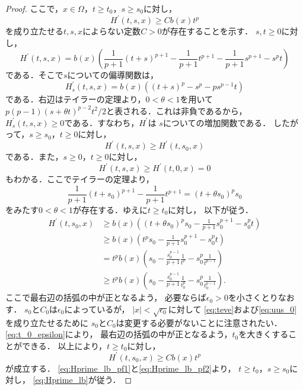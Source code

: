 \begin{proof}
ここで，$x \in \Omega$，$t \geq t_0$，$s \geq s_0$に対し，
\begin{equation}
 H^\prime (t, s, x) \geq C b(x) t^p \label{eq:Hprime_lb}
\end{equation}
を成り立たせる$t, s, x$によらない定数$C>0$が存在することを示す．
$s, t \geq 0$に対し，
\[
 H^\prime(t, s, x) = b(x) \left( \frac{1}{p+1}(t+s)^{p+1} -
 \frac{1}{p+1} t^{p+1} - \frac{1}{p+1} s^{p+1} - s^p t \right)
\]
である．そこで$s$についての偏導関数は，
\[
 H^\prime_s (t, s, x) = b(x) \left( (t+s)^p - s^p - ps^{p-1}t \right)
\]
である．右辺はテイラーの定理より，$0 < \theta < 1$を用いて
$p(p-1)(s + \theta t)^{p-2}t^2/2$と表される．これは非負であるから，
$H^\prime_s(t, s, x) \geq 0$である．すなわち，$H^\prime$は
$s$についての増加関数である．
したがって，$s \geq s_0$，$t \geq 0$に対し，
\begin{equation}
 H^\prime(t, s, x) \geq H^\prime(t, s_0, x) \label{eq:Hprime_lb_pf1}
\end{equation}
である．また，$s \geq 0$，$t \geq 0$に対し，
\begin{equation}
 H^\prime(t, s, x) \geq H^\prime(t, 0, x) = 0 \label{eq:Hprime_lb_pf3}
\end{equation}
もわかる．ここでテイラーの定理より，
\[
 \frac{1}{p+1} (t + s_0)^{p+1} - \frac{1}{p+1} t^{p+1} = (t + \theta
 s_0)^p s_0
\]
 をみたす$0 < \theta < 1$が存在する．ゆえに$t \geq t_0$に対し，
 以下が従う．
 \begin{align*}
  H^\prime(t, s_0, x) &\geq b(x) \left( (t+\theta s_0)^p s_0 -
  \frac{1}{p+1} s_0^{p+1} - s_0^p t\right) \\
  & \geq b(x) \left( t^p s_0 - \frac{1}{p+1} s_0^{p+1} - s_0^p t \right) \\
  & = t^p b(x) \left( s_0 - \frac{s_0^{p-1}}{p+1} \frac{1}{t^p} - s_0^p
  \frac{1}{t^{p-1}}  \right) \\
  & \geq t^p b(x) \left( s_0 - \frac{s_0^{p-1}}{p+1} \frac{1}{t_0^p} - s_0^p
  \frac{1}{t_0^{p-1}}  \right).
 \end{align*}
 ここで最右辺の括弧の中が正となるよう，
 必要ならば$\epsilon_0 > 0$を小さくとりなおす．
 $s_0$と$C_0$は$\epsilon_0$によっているが，
 $\lvert x \rvert < \sqrt{\epsilon_0}$に対して
 \eqref{eq:teve}および\eqref{eq:uus_0}を成り立たせるために
 $s_0$と$C_0$は変更する必要がないことに注意されたい．
 \eqref{eq:t_0_epsilon}により，
 最右辺の括弧の中が正となるよう，$t_0$を大きくすることができる．
 以上により，$t \geq t_0$に対し，
 \begin{equation}
  H^\prime (t, s_0, x) \geq C b(x) t^p \label{eq:Hprime_lb_pf2}
 \end{equation}
 が成立する．
 \eqref{eq:Hprime_lb_pf1}と\eqref{eq:Hprime_lb_pf2}より，
 $t \geq t_0$，$s \geq s_0$に対し，
 \eqref{eq:Hprime_lb}が従う．
 

\end{proof}
